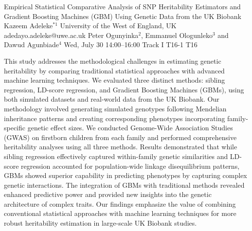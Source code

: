 \begin{talk}
  {Empirical Statistical Comparative Analysis of SNP Heritability Estimators and Gradient Boosting Machines (GBM) Using Genetic Data from the UK Biobank}%
  {Kazeem Adeleke$^{*1}$}%
  {University of the West of England, UK}%
  {adedayo.adeleke@uwe.ac.uk}%
  {Peter Ogunyinka$^{2}$, Emmanuel Ologunleko$^{3}$ and Dawud Agunbiade$^{4}$}%
  {}%
  {Wed, July 30 14:00–16:00 Track I}%
  {T16-1}%
  {T16}%
  
				
			
This study addresses the methodological challenges in estimating genetic heritability by comparing traditional statistical approaches with advanced machine learning techniques. We evaluated three distinct methods: sibling regression, LD-score regression, and Gradient Boosting Machines (GBMs), using both simulated datasets and real-world data from the UK Biobank. Our methodology involved generating simulated genotypes following Mendelian inheritance patterns and creating corresponding phenotypes incorporating family-specific genetic effect sizes. We conducted Genome-Wide Association Studies (GWAS) on firstborn children from each family and performed comprehensive heritability analyses using all three methods. Results demonstrated that while sibling regression effectively captured within-family genetic similarities and LD-score regression accounted for population-wide linkage disequilibrium patterns, GBMs showed superior capability in predicting phenotypes by capturing complex genetic interactions. The integration of GBMs with traditional methods revealed enhanced predictive power and provided new insights into the genetic architecture of complex traits. Our findings emphasize the value of combining conventional statistical approaches with machine learning techniques for more robust heritability estimation in large-scale UK Biobank studies.

\medskip


\end{talk}

